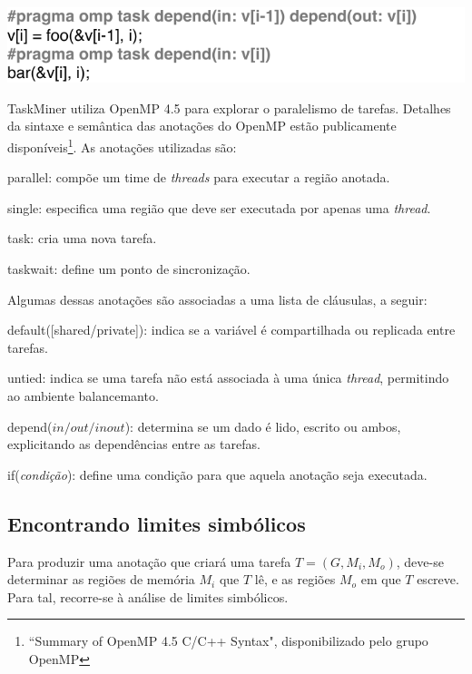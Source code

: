 \documentclass[sigconf]{acmart}
\newcommand\Taskminer{\mbox{\textsf{TaskMiner}}}
\begin{document}
\includegraphics[width=1\columnwidth]{images/ex_depends}

{\Taskminer} utiliza OpenMP 4.5 para explorar o paralelismo de tarefas. Detalhes da sintaxe e semântica
das anotações do OpenMP estão publicamente disponíveis\footnote{``Summary of OpenMP 4.5 C/C++ Syntax", disponibilizado
pelo grupo OpenMP}. As anotações utilizadas são:
%
\begin{compactitem}
\item \textsf{parallel}: compõe um time de \textit{threads}
para executar a região anotada.
\item \textsf{single}: especifica uma região que deve ser executada
por apenas uma \textit{thread}.
\item \textsf{task}: cria uma nova tarefa.
\item \textsf{taskwait}: define um ponto de sincronização.
\end{compactitem}
%
Algumas dessas anotações são associadas a uma lista de cláusulas, a seguir:
\begin{compactitem}
\item \textsf{default([shared/private])}: indica se a variável é compartilhada ou replicada
entre tarefas.
\item \textsf{untied}: indica se uma tarefa não está associada à uma única \textit{thread},
permitindo ao ambiente balancemanto.
\item \textsf{depend}($\mathit{in}/\mathit{out}/\mathit{inout}$): determina se um dado é lido, escrito
ou ambos, explicitando as dependências entre as tarefas.
\item \textsf{if}({\em condição}): define uma condição para que aquela anotação seja executada.
\end{compactitem}

\subsection{Encontrando limites simbólicos}
\label{sec:sra}

Para produzir uma anotação que criará uma tarefa $T = (G, M_i, M_o)$,
deve-se determinar as regiões de memória $M_i$ que $T$ lê, e as regiões
$M_o$ em que $T$ escreve. Para tal, recorre-se à análise de limites simbólicos.
 
\end{document}
